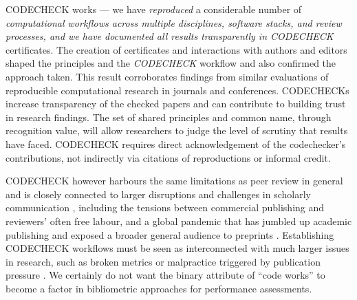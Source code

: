 \documentclass[12pt]{article}
\newcommand{\rev}[1]{\textit{#1}}
\begin{document}
CODECHECK works --- we have \rev{reproduced} a considerable number of
\rev{computational workflows across multiple disciplines, software stacks, and review
processes, and we have documented all results transparently in CODECHECK}
certificates.  The creation of certificates and
interactions with authors and editors shaped the principles and the
\rev{CODECHECK} workflow and also confirmed the approach taken. This result
corroborates findings from similar evaluations of reproducible
computational research in journals and conferences.  CODECHECKs
increase transparency of the checked papers and can contribute to
building trust in research findings.
The set of shared principles and common name, through recognition
value, will allow researchers to judge the level of scrutiny that
results have faced. CODECHECK requires direct acknowledgement of the
codechecker's contributions, not indirectly via citations of
reproductions or informal credit.

CODECHECK however harbours the same limitations as peer review in
general and is closely connected to larger disruptions and challenges
in scholarly communication
\cite{eglen_recent_2018,tennant_ten_2019,fyfe_mission_2019}, including
the tensions between commercial publishing and reviewers' often free
labour, and a global pandemic that has jumbled up academic
publishing and exposed a broader general audience to preprints
\cite{munafo_what_2020}.  Establishing CODECHECK
workflows must be seen as interconnected with much larger issues in
research, such as broken metrics or malpractice triggered by
publication pressure
\cite{piwowar_altmetrics:_2013,nosek_promoting_2015}.  We certainly do
not want the binary attribute of ``code works'' to become a factor in
bibliometric approaches for performance assessments.
\end{document}
